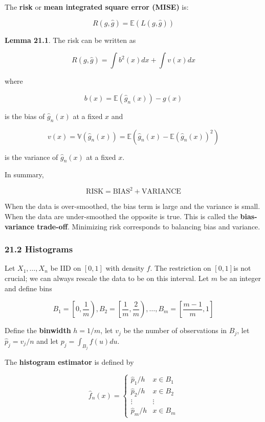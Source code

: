 The \textbf{risk} or \textbf{mean integrated square error (MISE)} is:

\[ R(g, \hat{g}) = \mathbb{E}\left(L(g, \hat{g}) \right) \]

\textbf{Lemma 21.1}. The risk can be written as

\[ R(g, \hat{g}) = \int b^2(x) dx + \int v(x) dx \]

where

\[ b(x) = \mathbb{E}(\hat{g}_n(x)) - g(x) \]

is the bias of \(\hat{g}_n(x)\) at a fixed \(x\) and

\[ v(x) = \mathbb{V}(\hat{g}_n(x)) = \mathbb{E}\left( \hat{g}_n(x) - \mathbb{E}(\hat{g}_n(x))^2\right) \]

is the variance of \(\hat{g}_n(x)\) at a fixed \(x\).

In summary,

\[ \text{RISK} = \text{BIAS}^2 + \text{VARIANCE} \]

When the data is over-smoothed, the bias term is large and the variance
is small. When the data are under-smoothed the opposite is true. This is
called the \textbf{bias-variance trade-off}. Minimizing risk corresponds
to balancing bias and variance.

\subsubsection{21.2 Histograms}\label{histograms}

Let \(X_1, \dots, X_n\) be IID on \([0, 1]\) with density \(f\). The
restriction on \([0, 1]\)is not crucial; we can always rescale the data
to be on this interval. Let \(m\) be an integer and define bins

\[ B_1 = \left[0, \frac{1}{m} \right), B_2 = \left[\frac{1}{m}, \frac{2}{m} \right), \dots, B_m = \left[\frac{m - 1}{m}, 1 \right] \]

Define the \textbf{binwidth} \(h = 1 / m\), let \(v_j\) be the number of
observations in \(B_j\), let \(\hat{p}_j = v_j / n\) and let
\(p_j = \int_{B_j} f(u) du\).

The \textbf{histogram estimator} is defined by

\[
\hat{f}_n(x) = \begin{cases}
\hat{p}_1 / h & x \in B_1 \\
\hat{p}_2 / h & x \in B_2 \\
\vdots & \vdots\\
\hat{p}_m / h & x \in B_m
\end{cases}
\]

